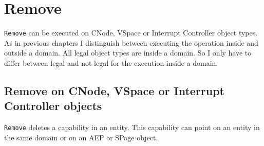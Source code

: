 \section{Remove}\label{sec:Remove}
\texttt{Remove} can be executed on CNode, VSpace or Interrupt Controller object types. \\
As in previous chapters I distinguish between executing the operation inside and outside a domain. All legal object types are inside a domain. So I only have to differ between legal and not legal for the execution inside a domain. 
\subsection{Remove on CNode, VSpace or Interrupt Controller objects} 
\texttt{Remove} deletes a capability in an entity. This capability can point on an entity in the same domain or on an AEP or SPage object. 
